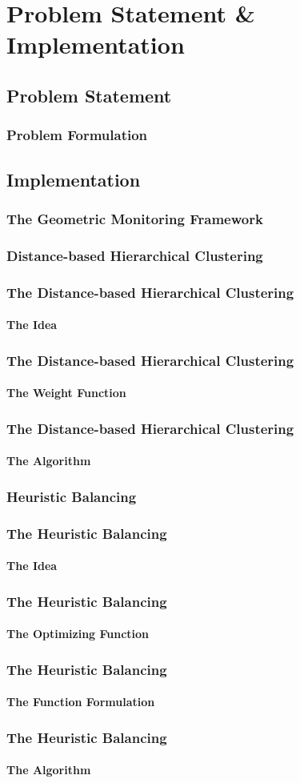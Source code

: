 \documentclass[hyperref={pdfpagelabels=false}]{beamer}
\begin{document}
\section{Problem Statement \& Implementation}
\subsection{Problem Statement}
\begin{frame} \frametitle{Problem Formulation}

\end{frame}
\subsection{Implementation}
\begin{frame} \frametitle{The Geometric Monitoring Framework}

\end{frame}
\subsubsection*{Distance-based Hierarchical Clustering}
\begin{frame} \frametitle{The Distance-based Hierarchical Clustering}\framesubtitle{The Idea}

\end{frame}
\begin{frame} \frametitle{The Distance-based Hierarchical Clustering}\framesubtitle{The Weight Function}

\end{frame}
\begin{frame} \frametitle{The Distance-based Hierarchical Clustering}\framesubtitle{The Algorithm}

\end{frame}
\subsubsection*{Heuristic Balancing}
\begin{frame} \frametitle{The Heuristic Balancing}\framesubtitle{The Idea}

\end{frame}
\begin{frame} \frametitle{The Heuristic Balancing}\framesubtitle{The Optimizing Function}

\end{frame}
\begin{frame} \frametitle{The Heuristic Balancing}\framesubtitle{The Function Formulation}

\end{frame}
\begin{frame} \frametitle{The Heuristic Balancing}\framesubtitle{The Algorithm}

\end{frame}
\end{document}
